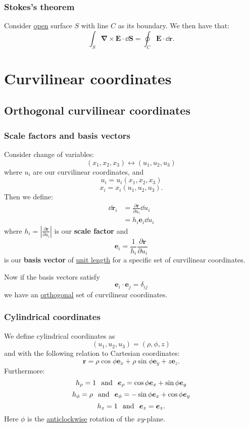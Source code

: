 \documentclass{article}
\begin{document}
\subsubsection{Stokes's theorem}
Consider \underline{open} surface $S$ with
line $C$ as its boundary. We then have that:
$$\int_S\boldsymbol{\nabla}\times\boldsymbol{E}\cdot
\dd\boldsymbol{S}=
\oint_C\boldsymbol{E}\cdot\dd\boldsymbol{r}.$$

\newpage

\section{Curvilinear coordinates}

\subsection{Orthogonal curvilinear coordinates}

\subsubsection{Scale factors and basis vectors}
Consider change of variables:
$$(x_1,x_2,x_3)\leftrightarrow(u_1,u_2,u_3)$$
where $u_i$ are our curvilinear coordinates, and
$$u_i=u_i(x_1,x_2,x_3)$$
$$x_i=x_i(u_1,u_2,u_3).$$
Then we define:
\begin{align*}
    \dd\boldsymbol{r}_i
    &=\frac{\partial\boldsymbol{r}}{\partial u_i}\dd u_i \\
    &=h_i\boldsymbol{e}_i \dd u_i
\end{align*}
where $h_i=|\displaystyle\frac{\partial\boldsymbol{r}}{\partial u_i}|$ is our \textbf{scale factor} and 
$$\boldsymbol{e}_i=\frac{1}{h_i}\frac{\partial\boldsymbol{r}}{\partial u_i}$$
is our \textbf{basis vector} of \underline{unit length} for a specific set of curvilinear coordinates.

Now if the basis vectors satisfy
$$\boldsymbol{e}_i\cdot\boldsymbol{e}_j=\delta_{ij}$$
we have an \underline{orthogonal} set of curvilinear coordinates.

\subsubsection{Cylindrical coordinates}
We define cylindrical coordinates as
$$(u_1,u_2,u_3)=(\rho,\phi,z)$$
and with the following relation to Cartesian coordinates:
$$\boldsymbol{r}=\rho\cos\phi\boldsymbol{e}_x
+\rho\sin\phi\boldsymbol{e}_y+z\boldsymbol{e}_z.$$
Furthermore:
$$h_{\rho}=1\hspace{0.1in}\text{and}\hspace{0.1in}\boldsymbol{e}_{\rho}=\cos\phi\boldsymbol{e}_{x}
+\sin\phi\boldsymbol{e}_{y}$$
$$h_{\phi}=\rho\hspace{0.1in}\text{and}\hspace{0.1in}
\boldsymbol{e}_{\phi}=-\sin\phi\boldsymbol{e}_x+\cos\phi\boldsymbol{e}_y$$
$$h_{z}=1\hspace{0.1in}\text{and}\hspace{0.1in}\boldsymbol{e}_z=\boldsymbol{e}_z.$$
Here $\phi$ is the \underline{anticlockwise} rotation of the $xy$-plane.
\end{document}
